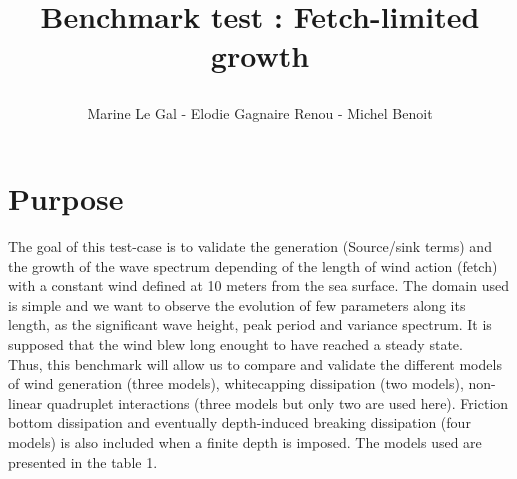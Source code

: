 \documentclass[10pt]{article}
\title{\begin{Large}
\textbf{Benchmark test : Fetch-limited growth}\\
\end{Large}}
\author{Marine Le Gal - Elodie Gagnaire Renou - Michel Benoit}
\begin{document}
\maketitle 

\section{Purpose}
The goal of this test-case is to validate the generation (Source/sink terms)  and the growth of the wave spectrum depending of the length of wind action (fetch) with a constant wind defined at 10 meters from the sea surface. The domain used is simple and we want to observe the evolution of few parameters along its length, as the significant wave height, peak period and variance spectrum. 
It is supposed that the wind blew long enought to have reached a steady state.\\
Thus, this benchmark will allow us to compare and validate the different models of wind generation (three models), whitecapping dissipation (two models), non-linear quadruplet interactions (three models but only two are used here). Friction bottom dissipation and eventually depth-induced breaking dissipation (four models) is also included when a finite depth is imposed. The models used are presented in the table 1.\\ \quad \\
\vspace{1cm}
\hspace{-2cm}
\end{document}

